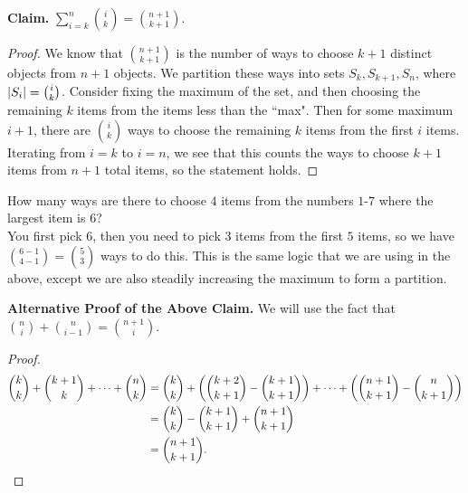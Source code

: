 \documentclass[class=article, crop=false]{standalone}
\begin{document}
  \textbf{Claim.} $\sum_{i=k}^{n}\binom{i}{k}=\binom{n+1}{k+1}$.
  \begin{proof}
    We know that $\binom{n+1}{k+1}$ is the number of ways to choose $k+1$ distinct objects from $n+1$ objects. We partition these ways into sets $S_k, S_{k+1}, S_n$, where $\left\lvert S_i \right\rvert = \binom{i}{k}$. Consider fixing the maximum of the set, and then choosing the remaining $k$ items from the items less than the ``max". Then for some maximum $i+1$, there are $\binom{i}{k}$ ways to choose the remaining $k$ items from the first $i$ items. Iterating from $i=k$ to $i=n$, we see that this counts the ways to choose $k+1$ items from $n+1$ total items, so the statement holds.
  \end{proof}
  \begin{example}{}
    How many ways are there to choose $4$ items from the numbers $1$-$7$ where the largest item is $6$? \\[10pt]
    You first pick $6$, then you need to pick $3$ items from the first $5$ items, so we have $\binom{6-1}{4-1} = \binom{5}{3}$ ways to do this. This is the same logic that we are using in the above, except we are also steadily increasing the maximum to form a partition.
  \end{example}
  \textbf{Alternative Proof of the Above Claim.} We will use the fact that $\binom{n}{i}+\binom{n}{i-1}=\binom{n+1}{i}$.
  \begin{proof}
    \begin{align*}
      \binom{k}{k}+\binom{k+1}{k}+ \dotsb+\binom{n}{k} &= \binom{k}{k}+\left( \binom{k+2}{k+1}-\binom{k+1}{k+1} \right)+ \dotsb+\left( \binom{n+1}{k+1}-\binom{n}{k+1} \right) \\
                                                       &= \binom{k}{k} - \binom{k+1}{k+1} + \binom{n+1}{k+1} \\
                                                       &= \binom{n+1}{k+1}.
    \end{align*}
  \end{proof}
\end{document}

